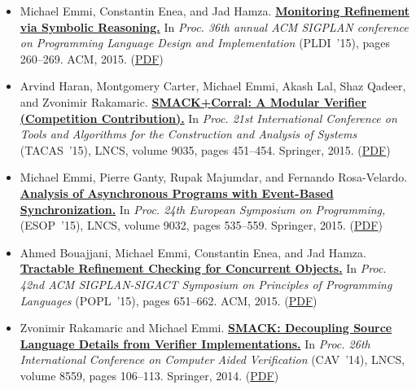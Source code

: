 \documentclass{article}
\begin{document}
\begin{itemize}[leftmargin=0cm,label={}]
    \item Michael Emmi, Constantin Enea, and Jad Hamza. {\bf\href{%
    http://doi.acm.org/10.1145/2737924.2737983}{%
    Monitoring Refinement via Symbolic Reasoning.}} In \emph{ Proc. 36th annual ACM SIGPLAN conference on Programming Language Design and Implementation } (PLDI ’15), pages 260–269. ACM, 2015. (\href{https://michael-emmi.github.io/https://github.com/michael-emmi/research-papers/raw/master/conf-pldi-EmmiEH15.pdf}{PDF})


    \item Arvind Haran, Montgomery Carter, Michael Emmi, Akash Lal, Shaz Qadeer, and Zvonimir Rakamaric. {\bf\href{%
    http://dx.doi.org/10.1007/978-3-662-46681-0_42}{%
    SMACK+Corral: A Modular Verifier (Competition Contribution).}} In \emph{ Proc. 21st International Conference on Tools and Algorithms for the Construction and Analysis of Systems } (TACAS ’15), LNCS, volume 9035, pages 451–454. Springer, 2015. (\href{https://michael-emmi.github.io/https://github.com/michael-emmi/research-papers/raw/master/conf-tacas-HaranCELQR15.pdf}{PDF})


    \item Michael Emmi, Pierre Ganty, Rupak Majumdar, and Fernando Rosa-Velardo. {\bf\href{%
    http://dx.doi.org/10.1007/978-3-662-46669-8_22}{%
    Analysis of Asynchronous Programs with Event-Based Synchronization.}} In \emph{ Proc. 24th European Symposium on Programming, } (ESOP ’15), LNCS, volume 9032, pages 535–559. Springer, 2015. (\href{https://michael-emmi.github.io/https://github.com/michael-emmi/research-papers/raw/master/conf-esop-EmmiGMR15.pdf}{PDF})


    \item Ahmed Bouajjani, Michael Emmi, Constantin Enea, and Jad Hamza. {\bf\href{%
    http://doi.acm.org/10.1145/2676726.2677002}{%
    Tractable Refinement Checking for Concurrent Objects.}} In \emph{ Proc. 42nd ACM SIGPLAN-SIGACT Symposium on Principles of Programming Languages } (POPL ’15), pages 651–662. ACM, 2015. (\href{https://michael-emmi.github.io/https://github.com/michael-emmi/research-papers/raw/master/conf-popl-BouajjaniEEH15.pdf}{PDF})


    \item Zvonimir Rakamaric and Michael Emmi. {\bf\href{%
    http://dx.doi.org/10.1007/978-3-319-08867-9_7}{%
    SMACK: Decoupling Source Language Details from Verifier Implementations.}} In \emph{ Proc. 26th International Conference on Computer Aided Verification } (CAV ’14), LNCS, volume 8559, pages 106–113. Springer, 2014. (\href{https://michael-emmi.github.io/https://github.com/michael-emmi/research-papers/raw/master/conf-cav-RakamaricE14.pdf}{PDF})



\end{itemize}
\end{document}
